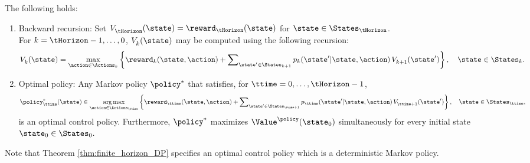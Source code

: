 \begin{theorem}\label{thm:finite_horizon_DP}
The following holds:
\begin{enumerate}
\item Backward recursion:  Set $V_\tHorizon^{}(\state) = {\reward_\tHorizon}(\state)$ for $\state\in {\States_\tHorizon}$.\\
     For $k = \tHorizon -1, \ldots ,0$, $V_k^{}(\state)$ may be computed using the following recursion:
\[V_k^{}(\state) = \mathop {\max }\limits_{\action \in {\Actions_k}} \left\{ {{\reward_k}(\state,\action) + \sum\nolimits_{\state' \in {\States_{k + 1}}} {{p_k}(\state'|\state,\action)\,} V_{k + 1}^{}(\state')} \right\},  \quad  \state \in {\States_k}.\]
\item Optimal policy: Any Markov policy ${\policy ^*}$ that satisfies, for $\ttime = 0, \ldots ,\tHorizon -1$,
\[\policy _\ttime^*(\state) \in \mathop {\arg \max }\limits_{\action \in {\Actions_\ttime}} \left\{ {{\reward_\ttime}(\state,\action) + \sum\nolimits_{\state' \in {\States_{\ttime + 1}}} {{p_\ttime}(\state'|\state,\action)\,} V_{\ttime + 1}^{}(\state')} \right\},\quad \state \in {\States_\ttime},\]
is an optimal control policy. Furthermore, ${\policy ^*}$ maximizes
${\Value^\policy }({\state_0})$ simultaneously for every initial state
${\state_0} \in {\States_0}.$
\end{enumerate}
\end{theorem}
Note that Theorem \ref{thm:finite_horizon_DP} specifies an optimal control policy which is a deterministic Markov policy.

